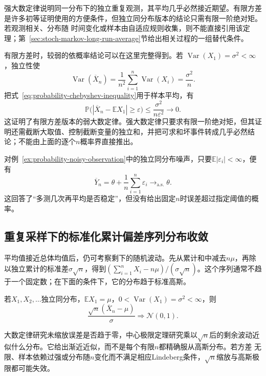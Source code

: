 强大数定律说明同一分布下的独立重复观测，其平均几乎必然接近期望。有限方差是许多初等证明使用的方便条件，但独立同分布版本的结论只需有限一阶绝对矩。若观测相关、分布随
时间变化或样本由自适应规则收集，则不能直接引用该定理；第~\ref{sec:stoch-markov-long-run-average}节给出相关过程的一组替代条件。

有限方差时，较弱的依概率结论可以在这里完整得到。若
\(\operatorname{Var}(X_1)=\sigma^2<\infty\)，独立性使
\[
  \operatorname{Var}(\overline{X}_n)
  =\frac{1}{n^2}\sum_{i=1}^{n}\operatorname{Var}(X_i)
  =\frac{\sigma^2}{n}.
\]
把式~\eqref{eq:probability-chebyshev-inequality}用于样本平均，有
\[
  \mathbb{P}\bigl(
    |\overline{X}_n-\mathbb{E}X_1|\geq\varepsilon
  \bigr)
  \leq\frac{\sigma^2}{n\varepsilon^2}\to0.
\]
这证明了有限方差版本的弱大数定律。强大数定律只要求有限一阶绝对矩，但其证明还需截断大取值、控制截断变量的独立和，并把可求和坏事件转成几乎必然结论；不能由上面的逐个\(n\)概率界直接推出。

对例~\ref{ex:probability-noisy-observation}中的独立同分布噪声，只要\(\mathbb{E}|\varepsilon_i|<\infty\)，便有
\[ \overline{Y}_n
  =\theta+\frac{1}{n}\sum_{i=1}^{n}\varepsilon_i\to_{\mathrm{a.s.}}\theta. \]
这回答了“多测几次再平均是否稳定”，但没有给出固定\(n\)时误差超过指定阈值的概率。

\subsection{重复采样下的标准化累计偏差序列分布收敛}

平均值接近总体均值后，仍可考察剩下的随机波动。先从累计和中减去\(n\mu\)，再除以独立累计的标准差\(\sigma\sqrt n\)，得到\((\sum_{i=1}^nX_i-n\mu)/(\sigma\sqrt n)\)。这个序列通常不趋于一个固定数；在下面的条件下，它的分布趋于标准高斯。
\label{sec:rv-standardized-sum-limits}
\begin{theorem}
\label{thm:probability-iid-central-limit}
若\(X_1,X_2,\ldots\)独立同分布，\(\mathbb{E}X_1=\mu\)，\(0<\operatorname{Var}(X_1)=\sigma^2<\infty\)，则
\[ \frac{\sqrt{n}(\overline{X}_n-\mu)}{\sigma}
  \Rightarrow\mathcal{N}(0,1). \]
\end{theorem}

大数定律研究未缩放误差是否趋于零，中心极限定理研究乘以\(\sqrt{n}\)后的剩余波动近似什么分布。它给出渐近近似，而不是每个有限\(n\)都精确服从高斯分布。若方差
无限、样本依赖过强或分布随\(n\)变化而不满足相应Lindeberg条件，\(\sqrt{n}\)缩放与高斯极限都可能失效。

